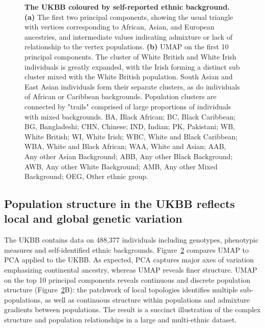 \begin{figure}
\begin{subfigure}{.5\columnwidth}
\caption{}
\label{fig:umap_ukbb_pc10}
\end{subfigure}%
\caption[The UKBB coloured by self-reported ethnic background]{\textbf{The UKBB coloured by self-reported ethnic background.} \textbf{(a)} The first two principal components, showing the usual triangle with vertices corresponding to African, Asian, and European ancestries, and intermediate values indicating admixture or lack of relationship to the vertex populations. \textbf{(b)} UMAP on the first 10 principal components. The cluster of White British and White Irish individuals is greatly expanded, with the Irish forming a distinct sub cluster mixed with the White British population. South Asian and East Asian individuals form their separate clusters, as do individuals of African or Caribbean backgrounds. Population clusters are connected by "trails" comprised of large proportions of individuals with mixed backgrounds.
BA, Black African; 
BC, Black Caribbean; 
BG, Bangladeshi; 
CHN, Chinese; 
IND, Indian;
PK, Pakistani;
WB, White British;
WI, White Irish;
WBC, White and Black Caribbean; 
WBA, White and Black African; 
WAA, White and Asian;
AAB, Any other Asian Background; 
ABB, Any other Black Background;
AWB, Any other White Background;
AMB, Any other Mixed Background;
OEG, Other ethnic group.
}
\label{fig:fig3}
\end{figure}

\clearpage

\subsection{Population structure in the UKBB reflects local and global genetic variation}

The UKBB contains data on 488,377 individuals including genotypes, phenotypic measures and self-identified ethnic backgrounds. Figure~\ref{fig:fig3} compares UMAP to PCA applied to the UKBB. As expected, PCA captures major axes of variation emphasizing continental ancestry, whereas UMAP reveals finer structure. UMAP on the top 10 principal components reveals continuous and discrete population structure (Figure~\ref{fig:fig3}B): the patchwork of local topologies identifies multiple sub-populations, as well as continuous structure within populations and admixture gradients between populations. The result is a succinct illustration of the complex structure and population relationships in a large and multi-ethnic dataset.

